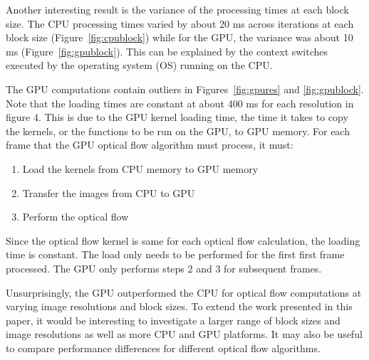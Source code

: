 \documentclass[12pt,letterpaper]{article}
\begin{document}
Another interesting result is the variance of the processing times at each
block size. The CPU processing times varied by about 20 ms across iterations at
each block size (Figure~\ref{fig:cpublock}) while for the GPU, the variance was
about 10 ms (Figure~\ref{fig:gpublock}). This can be explained by the context
switches executed by the operating system (OS) running on the CPU.

The GPU computations contain outliers in Figures~\ref{fig:gpures} and
\ref{fig:gpublock}. Note that the loading times are constant at about 400 ms
for each resolution in figure 4. This is due to the GPU kernel loading time,
the time it takes to copy the kernels, or the functions to be run on the GPU,
to GPU memory. For each frame that the GPU optical flow algorithm must process,
it must:

\begin{enumerate}
  \item Load the kernels from CPU memory to GPU memory
  \item Transfer the images from CPU to GPU
  \item Perform the optical flow
\end{enumerate}

Since the optical flow kernel is same for each optical flow calculation, the
loading time is constant. The load only needs to be performed for the first
first frame processed. The GPU only performs steps 2 and 3 for subsequent
frames.

Unsurprisingly, the GPU outperformed the CPU for optical flow computations at
varying image resolutions and block sizes. To extend the work presented in this
paper, it would be interesting to investigate a larger range of block sizes and
image resolutions as well as more CPU and GPU platforms. It may also be useful
to compare performance differences for different optical flow algorithms. 

\nocite{*}


\end{document}

